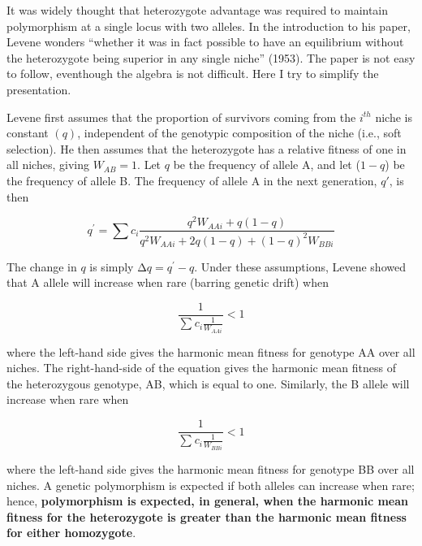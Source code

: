 \documentclass[
  letterpaper,
]{book}
\begin{document}
\begin{tcolorbox}[enhanced jigsaw, rightrule=.15mm, bottomtitle=1mm, opacitybacktitle=0.6, titlerule=0mm, opacityback=0, colbacktitle=quarto-callout-note-color!10!white, arc=.35mm, coltitle=black, title=\textcolor{quarto-callout-note-color}{\faInfo}\hspace{0.5em}{Box 2.1. Levene's model of multiple niche polymorphism.}, breakable, left=2mm, bottomrule=.15mm, leftrule=.75mm, toptitle=1mm, toprule=.15mm, colframe=quarto-callout-note-color-frame, colback=white]

It was widely thought that heterozygote advantage was required to
maintain polymorphism at a single locus with two alleles. In the
introduction to his paper, Levene wonders ``whether it was in fact
possible to have an equilibrium without the heterozygote being superior
in any single niche'' (1953). The paper is not easy to follow,
eventhough the algebra is not difficult. Here I try to simplify the
presentation.

Levene first assumes that the proportion of survivors coming from the
\(i^{th}\) niche is constant \((q)\), independent of the genotypic
composition of the niche (i.e., soft selection). He then assumes that
the heterozygote has a relative fitness of one in all niches, giving
\(W_{AB} = 1\). Let \(q\) be the frequency of allele A, and let
(\(1 - q\)) be the frequency of allele B. The frequency of allele A in
the next generation, \(q'\), is then

\[q^{'} = \sum_{}^{}c_{i}\frac{q^{2}W_{AAi} + q(1 - q)}{q^{2}W_{AAi} + 2q(1 - q) + (1 - q)^{2}W_{BBi}}\]

The change in \(q\) is simply \(\mathrm{\Delta}q = q^{'} - q\). Under
these assumptions, Levene showed that A allele will increase when rare
(barring genetic drift) when \textbar{}

\[\frac{1}{\sum_{}^{}{c_{i}\frac{1}{W_{AAi}}}} < 1\]

where the left-hand side gives the harmonic mean fitness for genotype AA
over all niches. The right-hand-side of the equation gives the harmonic
mean fitness of the heterozygous genotype, AB, which is equal to one.
Similarly, the B allele will increase when rare when

\[\frac{1}{\sum_{}^{}{c_{i}\frac{1}{W_{BBi}}}} < 1\]

where the left-hand side gives the harmonic mean fitness for genotype BB
over all niches. A genetic polymorphism is expected if both alleles can
increase when rare; hence, \textbf{polymorphism is expected, in general,
when the harmonic mean fitness for the heterozygote is greater than the
harmonic mean fitness for either homozygote}.


\end{tcolorbox}
\end{document}
